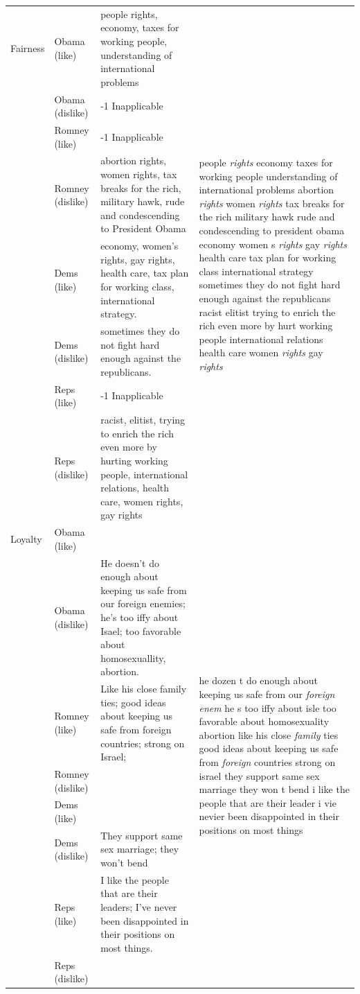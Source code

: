 \documentclass[12pt]{article}
\begin{document}
\begin{footnotesize}
\begin{center}
\begin{longtable}{lp{1.5cm}p{5.5cm}p{5.5cm}}
	Fairness & Obama (like) & people rights, economy, taxes for working people, understanding of international problems & \multirow{8}{5.5cm}{people \textit{rights} economy taxes for working people understanding of international problems abortion \textit{rights} women \textit{rights} tax breaks for the rich military hawk rude and condescending to president obama economy women s \textit{rights} gay \textit{rights} health care tax plan for working class international strategy sometimes they do not fight hard enough against the republicans racist elitist trying to enrich the rich even more by hurt working people international relations health care women \textit{rights} gay \textit{rights}} \\
	 & Obama (dislike) & -1 Inapplicable \\
	 & Romney (like) & -1 Inapplicable \\
	 & Romney (dislike) & abortion rights, women rights, tax breaks for the rich, military hawk, rude and condescending to President Obama \\
	 & Dems (like) & economy, women's rights, gay rights, health care, tax plan for working class, international strategy. \\
	 & Dems (dislike) & sometimes they do not fight hard enough against the republicans. \\
	 & Reps (like) & -1 Inapplicable \\
	 & Reps (dislike) & racist, elitist, trying to enrich the rich even more by hurting working people, international relations, health care, women rights, gay rights \\ \hline	
	
	Loyalty & Obama (like) &  & \multirow{8}{5.5cm}{he dozen t do enough about keeping us safe from our \textit{foreign} \textit{enem} he s too iffy about isle too favorable about homosexuality abortion like his close \textit{family} ties good ideas about keeping us safe from \textit{foreign} countries strong on israel they support same sex marriage they won t bend i like the people that are their leader i vie nevier been disappointed in their positions on most things} \\
	 & Obama (dislike) & He doesn't do enough about keeping us safe from our foreign enemies; he's too iffy about Isael; too favorable about homosexuallity, abortion. \\
	 & Romney (like) & Like his close family ties; good ideas about keeping us safe from foreign countries; strong on Israel; \\
	 & Romney (dislike) &  \\
	 & Dems (like) &  \\
	 & Dems (dislike) & They support same sex marriage; they won't bend \\
	 & Reps (like) & I like the people that are their leaders; I've never been disappointed in their positions on most things. \\
	 & Reps (dislike) &  \\ \hline
	 

\end{longtable}
\end{center}
\end{footnotesize}
\end{document}
